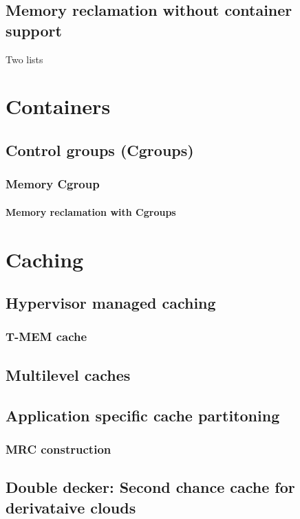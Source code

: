     \subsection{Memory reclamation without container support}
      Two lists 
      
  \section{Containers}
    \subsection{Control groups (Cgroups)}
      \subsubsection{Memory Cgroup}
	\paragraph{Memory reclamation with Cgroups}
      
  
  \section{Caching}
  
   \subsection{Hypervisor managed caching}
      \subsubsection{T-MEM cache}
    
   \subsection{Multilevel caches}
    
   \subsection{Application specific cache partitoning}
      \subsubsection{MRC construction}
      
   \subsection{Double decker: Second chance cache for derivataive clouds}
  
      

      